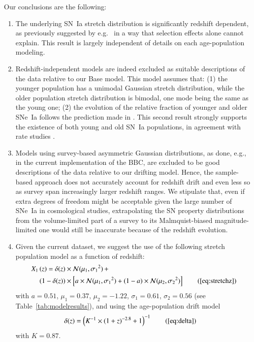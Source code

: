 \documentclass[]{aa}
\newcommand{\nn}[1]{\textcolor[rgb]{0.4, 0.8, 0}{#1}}
\begin{document}
Our conclusions are the following:
\begin{enumerate}
    \item The underlying SN~Ia stretch distribution is significantly redshift
        dependent, as previously suggested by e.g.~\cite{howell2007} \nn{in a
        way that selection effects alone cannot explain}. This result is largely
        independent of details on each age-population modeling.
    
    \item Redshift-independent models are indeed excluded as suitable
        descriptions of the data relative to our Base model. This model assumes
        that: (1) the younger population has a unimodal Gaussian stretch
        distribution, while the older population stretch distribution is
        bimodal, one mode being the same as the young one; (2) the evolution of
        the relative fraction of younger and older SNe~Ia follows the prediction
        made in \cite{rigault2018}. This second result strongly supports the
        existence of both young and old SN~Ia populations, in agreement with
        rate studies \cite{mannucci2005, scannapieco2005, sullivan2006,
        aubourg2008}. 
        
    \item Models using survey-based asymmetric Gaussian distributions, as done,
        e.g., in the current implementation of the BBC, are excluded to be good
        descriptions of the data relative to our drifting model. Hence, the
        sample-based approach does not accurately account for redshift drift and
        even less so as survey span increasingly larger redshift ranges. We
        stipulate that, even if extra degrees of freedom might be acceptable
        given the large number of SNe~Ia in cosmological studies, extrapolating
        the SN property distributions from the volume-limited part of a survey
        to its Malmquist-biased magnitude-limited one would still be inaccurate
        because of the redshift evolution.

    \item Given the current dataset, we suggest the use of the following stretch
        population model as a function of redshift:
        \begin{align*}
        \label{eqconclusion:stretchz}
            X_1\left(z \right) =
            \delta(z)&\times\mathcal{N}(\mu_1,\sigma_1{}^2)\,+\nonumber\\
            (1-\delta(z))&\times \left[a\times\mathcal{N}(\mu_1,\sigma_1{}^2) +
            (1-a)\times\mathcal{N}(\mu_2,\sigma_2{}^2)\right]
            \tag{\ref{eq:stretchz}}
        \end{align*}
        with $a=0.51$, $\mu_1=0.37$, $\mu_2=-1.22$, $\sigma_1=0.61$,
        $\sigma_2=0.56$ (see Table~\ref{tab:modelresults}), and using the
        age-population drift model \begin{align*}
            \delta(z) & = \left( K^{-1} \times (1+z)^{-2.8} +1 \right)^{-1}
            \tag{\ref{eq:delta}}
        \end{align*}
        with $K=0.87$.
\end{enumerate}
\end{document}
